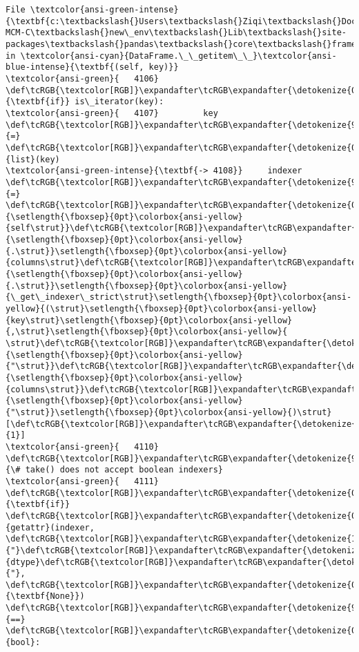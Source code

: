 \documentclass[11pt]{article}
\begin{document}
\begin{Verbatim}[commandchars=\\\{\}, frame=single, framerule=2mm, rulecolor=\color{outerrorbackground}]
File \textcolor{ansi-green-intense}{\textbf{c:\textbackslash{}Users\textbackslash{}Ziqi\textbackslash{}Documents\textbackslash{}Python\textbackslash{}2025-MCM-C\textbackslash{}new\_env\textbackslash{}Lib\textbackslash{}site-packages\textbackslash{}pandas\textbackslash{}core\textbackslash{}frame.py:4108}}, in \textcolor{ansi-cyan}{DataFrame.\_\_getitem\_\_}\textcolor{ansi-blue-intense}{\textbf{(self, key)}}
\textcolor{ansi-green}{   4106}     \def\tcRGB{\textcolor[RGB]}\expandafter\tcRGB\expandafter{\detokenize{0,135,0}}{\textbf{if}} is\_iterator(key):
\textcolor{ansi-green}{   4107}         key \def\tcRGB{\textcolor[RGB]}\expandafter\tcRGB\expandafter{\detokenize{98,98,98}}{=} \def\tcRGB{\textcolor[RGB]}\expandafter\tcRGB\expandafter{\detokenize{0,135,0}}{list}(key)
\textcolor{ansi-green-intense}{\textbf{-> 4108}}     indexer \def\tcRGB{\textcolor[RGB]}\expandafter\tcRGB\expandafter{\detokenize{98,98,98}}{=} \def\tcRGB{\textcolor[RGB]}\expandafter\tcRGB\expandafter{\detokenize{0,135,0}}{\setlength{\fboxsep}{0pt}\colorbox{ansi-yellow}{self\strut}}\def\tcRGB{\textcolor[RGB]}\expandafter\tcRGB\expandafter{\detokenize{98,98,98}}{\setlength{\fboxsep}{0pt}\colorbox{ansi-yellow}{.\strut}}\setlength{\fboxsep}{0pt}\colorbox{ansi-yellow}{columns\strut}\def\tcRGB{\textcolor[RGB]}\expandafter\tcRGB\expandafter{\detokenize{98,98,98}}{\setlength{\fboxsep}{0pt}\colorbox{ansi-yellow}{.\strut}}\setlength{\fboxsep}{0pt}\colorbox{ansi-yellow}{\_get\_indexer\_strict\strut}\setlength{\fboxsep}{0pt}\colorbox{ansi-yellow}{(\strut}\setlength{\fboxsep}{0pt}\colorbox{ansi-yellow}{key\strut}\setlength{\fboxsep}{0pt}\colorbox{ansi-yellow}{,\strut}\setlength{\fboxsep}{0pt}\colorbox{ansi-yellow}{ \strut}\def\tcRGB{\textcolor[RGB]}\expandafter\tcRGB\expandafter{\detokenize{175,0,0}}{\setlength{\fboxsep}{0pt}\colorbox{ansi-yellow}{"\strut}}\def\tcRGB{\textcolor[RGB]}\expandafter\tcRGB\expandafter{\detokenize{175,0,0}}{\setlength{\fboxsep}{0pt}\colorbox{ansi-yellow}{columns\strut}}\def\tcRGB{\textcolor[RGB]}\expandafter\tcRGB\expandafter{\detokenize{175,0,0}}{\setlength{\fboxsep}{0pt}\colorbox{ansi-yellow}{"\strut}}\setlength{\fboxsep}{0pt}\colorbox{ansi-yellow}{)\strut}[\def\tcRGB{\textcolor[RGB]}\expandafter\tcRGB\expandafter{\detokenize{98,98,98}}{1}]
\textcolor{ansi-green}{   4110} \def\tcRGB{\textcolor[RGB]}\expandafter\tcRGB\expandafter{\detokenize{95,135,135}}{\# take() does not accept boolean indexers}
\textcolor{ansi-green}{   4111} \def\tcRGB{\textcolor[RGB]}\expandafter\tcRGB\expandafter{\detokenize{0,135,0}}{\textbf{if}} \def\tcRGB{\textcolor[RGB]}\expandafter\tcRGB\expandafter{\detokenize{0,135,0}}{getattr}(indexer, \def\tcRGB{\textcolor[RGB]}\expandafter\tcRGB\expandafter{\detokenize{175,0,0}}{"}\def\tcRGB{\textcolor[RGB]}\expandafter\tcRGB\expandafter{\detokenize{175,0,0}}{dtype}\def\tcRGB{\textcolor[RGB]}\expandafter\tcRGB\expandafter{\detokenize{175,0,0}}{"}, \def\tcRGB{\textcolor[RGB]}\expandafter\tcRGB\expandafter{\detokenize{0,135,0}}{\textbf{None}}) \def\tcRGB{\textcolor[RGB]}\expandafter\tcRGB\expandafter{\detokenize{98,98,98}}{==} \def\tcRGB{\textcolor[RGB]}\expandafter\tcRGB\expandafter{\detokenize{0,135,0}}{bool}:


\end{Verbatim}
\end{document}

